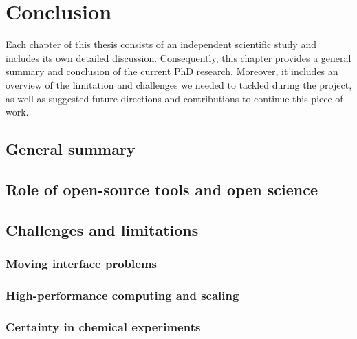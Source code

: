 \chapter{Conclusion}\label{ch:conclusion}


Each chapter of this thesis consists of an independent scientific study and includes its own detailed discussion. Consequently, this chapter provides a general summary and conclusion of the current PhD research. Moreover, it includes an overview of the limitation and challenges we needed to tackled during the project, as well as suggested future directions and contributions to continue this piece of work.

\section{General summary}


\section{Role of open-source tools and open science}


\section{Challenges and limitations}

\subsection{Moving interface problems}


\subsection{High-performance computing and scaling}


\subsection{Certainty in chemical experiments}

